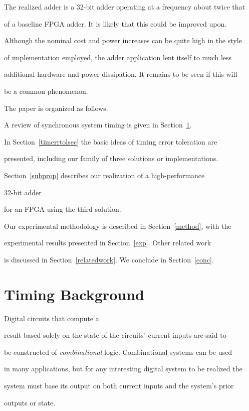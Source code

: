 \documentclass[12pt,dvips]{article}
\begin{document}
The realized adder is a 32-bit adder operating at a frequency about twice that

of a baseline FPGA adder. It is likely that this could be improved upon.

Although the nominal cost and power increases can be quite high in the style

of implementation employed, the adder application lent itself to much less

additional hardware and power dissipation. It remains to be seen if this will

be a common phenomenon.



The paper is organized as follows.

A review of synchronous system timing is given in Section~\ref{timingback}.

In Section~\ref{timerrtolsec} the basic ideas of timing error toleration are

presented, including our family of three solutions or implementations.

Section~\ref{subprop} describes our realization of a high-performance

32-bit adder

for an FPGA using the third solution.

Our experimental methodology is described in Section~\ref{method}, with the

experimental results presented in Section~\ref{exp}. Other related work

is discussed in Section~\ref{relatedwork}. We conclude in Section~\ref{conc}.



\section{Timing Background}

\label{timingback}

Digital circuits that compute a

result based solely on the state of the circuits' current inputs are said to

be constructed of {\it combinational} logic. Combinational systems can be used

in many applications, but for any interesting digital system to be realized the

system must base its output on both current inputs and the system's prior

outputs or state.
\end{document}
